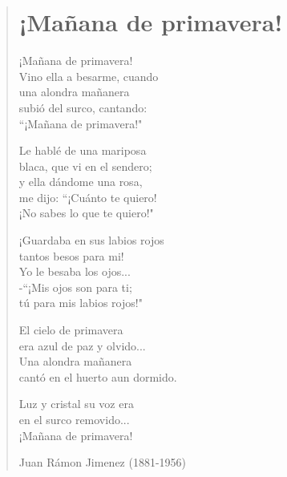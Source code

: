 \documentclass[12pt, twoside]{book}
\begin{document}
\begin{verse}
\begin{center}
\section{¡Mañana de primavera!}
\end{center}

¡Mañana de primavera!\\
Vino ella a besarme, cuando\\
una alondra mañanera\\
subió del surco, cantando:\\
``¡Mañana de primavera!"\newline

Le hablé de una mariposa\\
blaca, que vi en el sendero;\\
y ella dándome una rosa,\\
me dijo: ``¡Cuánto te quiero!\\
¡No sabes lo que te quiero!"\newline

¡Guardaba en sus labios rojos\\
tantos besos para mi!\\
Yo le besaba los ojos...\\
-``¡Mis ojos son para ti;\\
tú para mis labios rojos!"\newline

El cielo de primavera\\
era azul de paz y olvido...\\
Una alondra mañanera\\
cantó en el huerto aun dormido.\newline

Luz y cristal su voz era\\
en el surco removido...\\
¡Mañana de primavera!\newline

Juan Rámon Jimenez (1881-1956)

\end{verse}
\newpage
\end{document}
